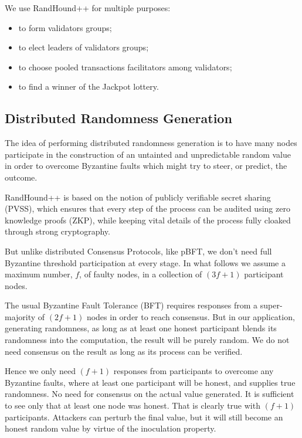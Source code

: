 \documentclass[a4paper, 10pt, conference]{ieeeconf}
\begin{document}
We use RandHound++ for multiple purposes:

\begin{itemize}
	\item {to form validators groups;}
	\item {to elect leaders of validators groups;} 
	\item {to choose pooled transactions facilitators among validators;}
	\item {to find a winner of the Jackpot lottery.}
\end{itemize}

\subsection{Distributed Randomness Generation}

The idea of performing distributed randomness generation is to have many nodes participate in the construction of an untainted and unpredictable random value in order to overcome Byzantine faults which might try to steer, or predict, the outcome.

RandHound++ is based on the notion of publicly verifiable secret sharing (PVSS)\cite{c15}, which ensures that every step of the process can be audited using zero knowledge proofs (ZKP), while keeping vital details of the process fully cloaked through strong cryptography.

But unlike distributed Consensus Protocols, like pBFT, we don't need full Byzantine threshold participation at every stage. In what follows we assume a maximum number, $f$, of faulty nodes, in a collection of $(3 f + 1)$ participant nodes. 

The usual Byzantine Fault Tolerance (BFT) requires responses from a super-majority of $(2 f + 1)$ nodes in order to reach consensus. But in our application, generating randomness, as long as at least one honest participant blends its randomness into the computation, the result will be purely random. We do not need consensus on the result as long as its process can be verified.

Hence we only need $(f + 1)$ responses from participants to overcome any Byzantine faults, where at least one participant will be honest, and supplies true randomness. No need for consensus on the actual value generated. It is sufficient to see only that at least one node was honest. That is clearly true with $(f + 1)$ participants. Attackers can perturb the final value, but it will still become an honest random value by virtue of the inoculation property.
\end{document}
